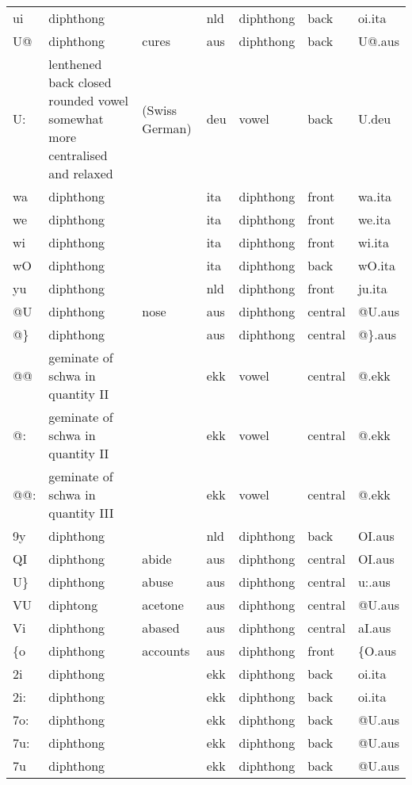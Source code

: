 \begin{longtable}{l|l|l|l|l|l|l}
ui	& diphthong	& 	& nld	& diphthong	& back\textgreaterfront	& oi.ita\\
U@	& diphthong	& cures	& aus	& diphthong	& back\textgreatercentral	& U@.aus\\
U:	& lenthened back closed rounded vowel somewhat more centralised and relaxed	& (Swiss German)	& deu	& vowel	& back	& U.deu\\
wa	& diphthong	& 	& ita	& diphthong	& front	& wa.ita\\
we	& diphthong	& 	& ita	& diphthong	& front	& we.ita\\
wi	& diphthong	& 	& ita	& diphthong	& front	& wi.ita\\
wO	& diphthong	& 	& ita	& diphthong	& back	& wO.ita\\
yu	& diphthong	& 	& nld	& diphthong	& front\textgreaterback	& ju.ita\\
@U	& diphthong	& nose	& aus	& diphthong	& central\textgreaterback	& @U.aus\\
@\}	& diphthong	& 	& aus	& diphthong	& central	& @\}.aus\\
@@	& geminate of schwa in quantity II	& 	& ekk	& vowel	& central	& @.ekk\\
@:	& geminate of schwa in quantity II	& 	& ekk	& vowel	& central	& @.ekk\\
@@:	& geminate of schwa in quantity III	& 	& ekk	& vowel	& central	& @.ekk\\
9y	& diphthong	& 	& nld	& diphthong	& back\textgreaterfront	& OI.aus\\
QI	& diphthong	& abide	& aus	& diphthong	& central\textgreaterfront	& OI.aus\\
U\}	& diphthong	& abuse	& aus	& diphthong	& central\textgreaterback	& u:.aus\\
VU	& diphtong	& acetone	& aus	& diphthong	& central\textgreaterback	& @U.aus\\
Vi	& diphthong	& abased	& aus	& diphthong	& central\textgreaterfront	& aI.aus\\
\{o	& diphthong	& accounts	& aus	& diphthong	& front\textgreaterback	& \{O.aus\\
2i	& diphthong	& 	& ekk	& diphthong	& back\textgreaterfront	& oi.ita\\
2i:	& diphthong	& 	& ekk	& diphthong	& back\textgreaterfront	& oi.ita\\
7o:	& diphthong	& 	& ekk	& diphthong	& back	& @U.aus\\
7u:	& diphthong	& 	& ekk	& diphthong	& back	& @U.aus\\
7u	& diphthong	& 	& ekk	& diphthong	& back	& @U.aus\\

\end{longtable}

